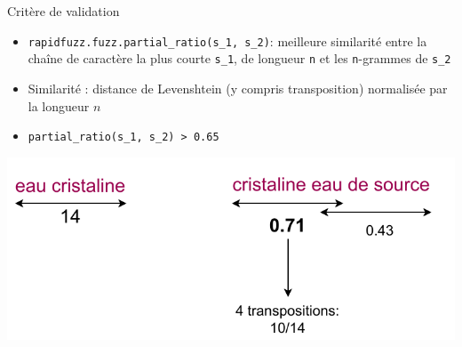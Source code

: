 \documentclass[ignorenonframetext,]{beamer}
\begin{document}
\begin{frame}{Critère de validation}
\begin{itemize}
    \item \texttt{rapidfuzz.fuzz.partial\_ratio(s\_1, s\_2)}: meilleure similarité entre la chaîne de caractère la plus courte \texttt{s\_1}, de longueur \texttt{n} et les \texttt{n}-grammes de  \texttt{s\_2}
    \item Similarité : distance de Levenshtein (y compris transposition) normalisée par la longueur $n$
    \item \texttt{partial\_ratio(s\_1, s\_2) > 0.65}
    
\end{itemize}
   \includegraphics[width=0.8\linewidth]{images/partial_ratio.pdf}
    
\end{frame}
\end{document}
